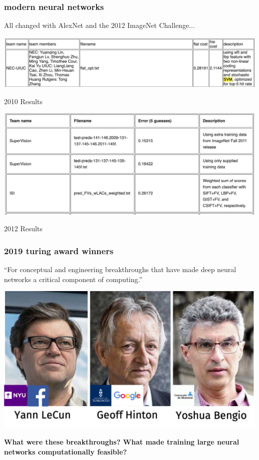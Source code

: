 \documentclass[handout,compress]{beamer}
\begin{document}
\begin{frame}
	\frametitle{modern neural networks}
	\small
	All changed with AlexNet and the 2012 ImageNet Challenge...
	\begin{center}
		\includegraphics[width=.7\textwidth]{imagenet2010.png}
		
		2010 Results
	\end{center}
	\begin{center}
	\includegraphics[width=.7\textwidth]{imagenet2012.png}
	
	2012 Results
	\end{center}
\end{frame}

\begin{frame}
	\frametitle{2019 turing award winners}
	\small
``For conceptual and engineering breakthroughs that have made deep neural networks a critical component of computing.''
		\begin{center}
		\includegraphics[width=.7\textwidth]{turing_annotate.png}
	\end{center}
	\textbf{What were these breakthroughs? What made training large neural networks computationally feasible?}
\end{frame}
\end{document}

